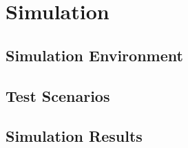 \chapter{Simulation}
\label{chap:simulation}


\section{Simulation Environment}

\section{Test Scenarios}

\section{Simulation Results}


